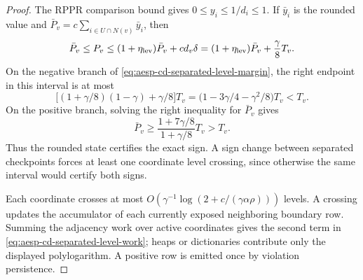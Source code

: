 \begin{proof}
The RPPR comparison bound gives $0\leq y_i\leq1/d_i\leq1$.  If
$\bar y_i$ is the rounded value and
$\bar P_v=c\sum_{i\in U\cap N(v)}\bar y_i$, then
\begin{equation}
 \bar P_v\leq P_v
 \leq(1+\eta_{\rm lev})\bar P_v+c d_v\delta
 =(1+\eta_{\rm lev})\bar P_v+\frac\gamma8T_v.
 \label{eq:aesp-cd-separated-level-envelope}
\end{equation}
On the negative branch of
\cref{eq:aesp-cd-separated-level-margin}, the right endpoint in this interval
is at most
\begin{equation*}
 \bigl[(1+\gamma/8)(1-\gamma)+\gamma/8\bigr]T_v
 =\bigl(1-3\gamma/4-\gamma^2/8\bigr)T_v<T_v.
\end{equation*}
On the positive branch, solving the right inequality for $\bar P_v$ gives
\begin{equation*}
 \bar P_v\geq
 \frac{1+7\gamma/8}{1+\gamma/8}T_v>T_v.
\end{equation*}
Thus the rounded state certifies the exact sign.  A sign change between
separated checkpoints forces at least one coordinate level crossing, since
otherwise the same interval would certify both signs.

Each coordinate crosses at most
$O(\gamma^{-1}\log(2+c/(\gamma\alpha\rho)))$ levels.  A crossing updates the
accumulator of each currently exposed neighboring boundary row.  Summing the
adjacency work over active coordinates gives the second term in
\cref{eq:aesp-cd-separated-level-work}; heaps or dictionaries contribute only
the displayed polylogarithm.  A positive row is emitted once by violation
persistence.
\end{proof}

